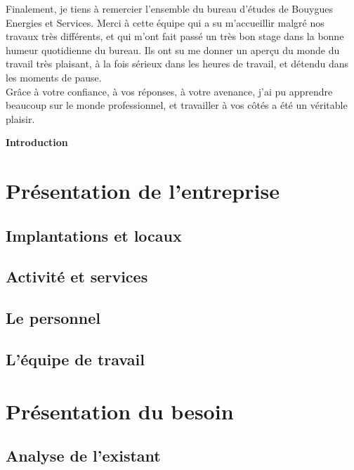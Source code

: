 \documentclass[a4paper]{article}
\begin{document}
    Finalement, je tiens à remercier l'ensemble du bureau d'études de Bouygues Energies et Services. Merci à cette équipe qui a su m'accueillir malgré nos travaux très différents, et qui m'ont fait passé un très bon stage dans la bonne humeur quotidienne du bureau. Ils ont su me donner un aperçu du monde du travail très plaisant, à la fois sérieux dans les heures de travail, et détendu dans les moments de pause. \vspace{10pt} \\

    Grâce à votre confiance, à vos réponses, à votre avenance, j'ai pu apprendre beaucoup sur le monde professionnel, et travailler à vos côtés a été un véritable plaisir. \\
    
    \newpage
    \tableofcontents
    
    \newpage 
    \huge \textbf{Introduction} \vspace{5pt} \\
    
    \newpage 
    \section{Présentation de l'entreprise}
    \subsection{Implantations et locaux}
    \subsection{Activité et services}
    \subsection{Le personnel}
    \subsection{L'équipe de travail}
    
    \section{Présentation du besoin}
    \subsection{Analyse de l'existant}
\end{document}
